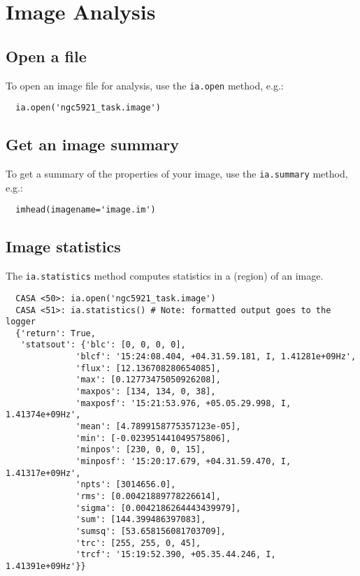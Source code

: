 

\chapter{Image Analysis}
\label{chapter:ia}

\section{Open a file}
\label{section:ia.open}

To open an image file for analysis, use 
the {\tt ia.open} method, e.g.: 
\small
\begin{verbatim}
  ia.open('ngc5921_task.image')
\end{verbatim}
\normalsize

\section{Get an image summary}
\label{section:ia.summary}

To get a summary of the properties of your image, use 
the {\tt ia.summary} method, e.g.: 
\small
\begin{verbatim}
  imhead(imagename='image.im')
\end{verbatim}
\normalsize

\section{Image statistics}
\label{section:ia.stats}

The {\tt ia.statistics} method computes statistics in a (region)
of an image.

\small
\begin{verbatim}
  CASA <50>: ia.open('ngc5921_task.image')
  CASA <51>: ia.statistics() # Note: formatted output goes to the logger
  {'return': True,
   'statsout': {'blc': [0, 0, 0, 0],
              'blcf': '15:24:08.404, +04.31.59.181, I, 1.41281e+09Hz',
              'flux': [12.136708280654085],
              'max': [0.12773475050926208],
              'maxpos': [134, 134, 0, 38],
              'maxposf': '15:21:53.976, +05.05.29.998, I, 1.41374e+09Hz',
              'mean': [4.7899158775357123e-05],
              'min': [-0.023951441049575806],
              'minpos': [230, 0, 0, 15],
              'minposf': '15:20:17.679, +04.31.59.470, I, 1.41317e+09Hz',
              'npts': [3014656.0],
              'rms': [0.00421889778226614],
              'sigma': [0.0042186264443439979],
              'sum': [144.399486397083],
              'sumsq': [53.658156081703709],
              'trc': [255, 255, 0, 45],
              'trcf': '15:19:52.390, +05.35.44.246, I, 1.41391e+09Hz'}}
\end{verbatim}
\normalsize

